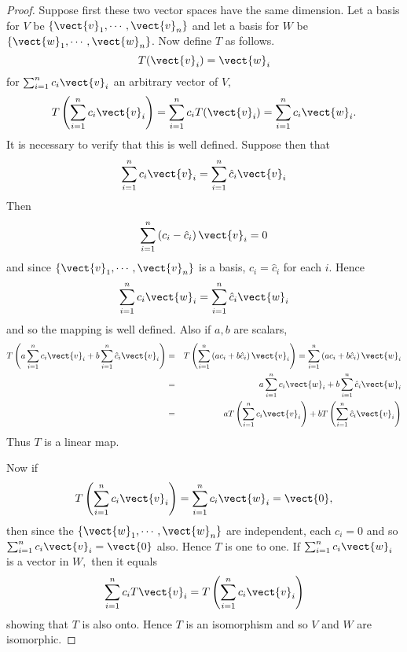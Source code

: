 \begin{proof}Suppose first these two vector spaces have the same
dimension. Let a basis for $V$ be $\left\{ 
\vect{v}_{1},\cdots ,\vect{v}_{n}\right\} $ and let a basis for $W$ be $
\left\{ \vect{w}_{1},\cdots ,\vect{w}_{n}\right\} $. Now define $T$ as
follows. 
\begin{equation*}
T(\vect{v}_{i})=\vect{w}_{i}
\end{equation*}
for $\sum_{i=1}^{n}c_{i}\vect{v}_{i}$ an arbitrary vector of $V,$%
\begin{equation*}
T\left( \sum_{i=1}^{n}c_{i}\vect{v}_{i}\right) = \sum_{i=1}^{n}c_{i}T
(\vect{v}_{i})=\sum_{i=1}^{n}c_{i}\vect{w}_{i}.
\end{equation*}
It is necessary to verify that this is well defined. Suppose then that 
\begin{equation*}
\sum_{i=1}^{n}c_{i}\vect{v}_{i}=\sum_{i=1}^{n}\hat{c}_{i}\vect{v}_{i}
\end{equation*}
Then 
\begin{equation*}
\sum_{i=1}^{n}\left( c_{i}-\hat{c}_{i}\right) \vect{v}_{i}=0
\end{equation*}
and since $\left\{ \vect{v}_{1},\cdots ,\vect{v}_{n}\right\} $ is a basis, $
c_{i}=\hat{c}_{i}$ for each $i$. Hence 
\begin{equation*}
\sum_{i=1}^{n}c_{i}\vect{w}_{i}=\sum_{i=1}^{n}\hat{c}_{i}\vect{w}_{i}
\end{equation*}
and so the mapping is well defined. Also if $a,b$ are scalars, 
\begin{eqnarray*}
T\left( a\sum_{i=1}^{n}c_{i}\vect{v}_{i}+b\sum_{i=1}^{n}\hat{c}_{i}\vect{v}
_{i}\right) &=&T\left( \sum_{i=1}^{n}\left( ac_{i}+b\hat{c}_{i}\right) \vect{v
}_{i}\right) =\sum_{i=1}^{n}\left( ac_{i}+b\hat{c}_{i}\right) \vect{w}_{i} \\
&=&a\sum_{i=1}^{n}c_{i}\vect{w}_{i}+b\sum_{i=1}^{n}\hat{c}_{i}\vect{w}_{i} \\
&=&aT\left( \sum_{i=1}^{n}c_{i}\vect{v}_{i}\right) +bT\left( \sum_{i=1}^{n}
\hat{c}_{i}\vect{v}_{i}\right)
\end{eqnarray*}
Thus $T$ is a linear map.

Now if 
\begin{equation*}
T\left( \sum_{i=1}^{n}c_{i}\vect{v}_{i}\right) =\sum_{i=1}^{n}c_{i}\vect{w}
_{i}=\vect{0},
\end{equation*}
then since the $\left\{ \vect{w}_{1},\cdots ,\vect{w}_{n}\right\} $ are
independent, each $c_{i}=0$ and so $\sum_{i=1}^{n}c_{i}\vect{v}_{i}=\vect{0}$
also. Hence $T$ is one to one. If $\sum_{i=1}^{n}c_{i}\vect{w}_{i}$ is a
vector in $W,$ then it equals 
\begin{equation*}
\sum_{i=1}^{n}c_{i}T\vect{v}_{i}=T\left( \sum_{i=1}^{n}c_{i}\vect{v}_{i}\right)
\end{equation*}
showing that $T$ is also onto. Hence $T$ is an isomorphism and so $V$ and $W$
are isomorphic.


\end{proof}
